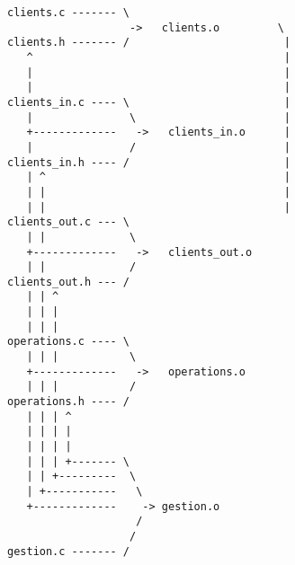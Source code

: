\documentclass[10pt]{article}
\begin{document}
\begin{enumerate}[label=\textbf{[\alph*]}]
\begin{verbatim}
clients.c ------- \
                   ->   clients.o         \
clients.h ------- /                        |
   ^                                       |
   |                                       |
   |                                       |
clients_in.c ---- \                        |
   |               \                       |
   +-------------   ->   clients_in.o      |
   |               /                       |
clients_in.h ---- /                        |
   | ^                                     |
   | |                                     |
   | |                                     |
clients_out.c --- \
   | |             \
   +-------------   ->   clients_out.o
   | |             /
clients_out.h --- /
   | | ^
   | | |
   | | |
operations.c ---- \
   | | |           \
   +-------------   ->   operations.o
   | | |           /
operations.h ---- /
   | | | ^
   | | | |
   | | | |
   | | | +------- \
   | | +---------  \
   | +-----------   \
   +-------------    -> gestion.o
                    /
                   /
gestion.c ------- /

\end{verbatim}

\end{enumerate}
\end{document}
